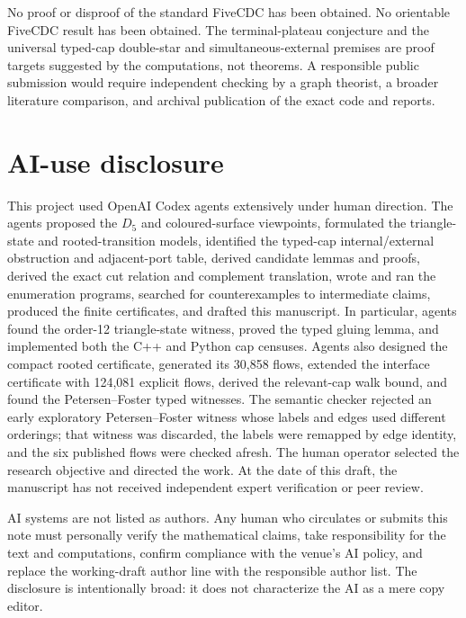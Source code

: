 \documentclass[11pt]{article}
\theoremstyle{definition}
\theoremstyle{remark}
\begin{document}
No proof or disproof of the standard FiveCDC has been obtained.  No
orientable FiveCDC result has been obtained.  The terminal-plateau
conjecture and the universal typed-cap double-star and simultaneous-external
premises are proof targets
suggested by the computations, not theorems.
A responsible public submission would require independent checking by a
graph theorist, a broader literature comparison, and archival publication
of the exact code and reports.

\section*{AI-use disclosure}

This project used OpenAI Codex agents extensively under human direction.
The agents proposed the \(D_5\) and coloured-surface viewpoints, formulated
the triangle-state and rooted-transition models, identified the typed-cap
internal/external obstruction and adjacent-port table, derived candidate
lemmas and proofs, derived the exact cut relation and complement translation,
wrote
and ran the enumeration programs, searched for counterexamples to
intermediate claims, produced the finite certificates, and drafted this
manuscript.  In particular, agents found the order-12 triangle-state
witness, proved the typed gluing lemma, and implemented both the C++ and
Python cap censuses.  Agents also designed the compact rooted certificate,
generated its 30,858 flows, extended the interface certificate with 124,081
explicit flows, derived the relevant-cap walk bound, and found
the Petersen--Foster typed witnesses.  The semantic checker rejected an
early exploratory Petersen--Foster witness whose labels and edges used
different orderings; that witness was discarded, the labels were remapped
by edge identity, and the six published flows were checked afresh.  The
human operator selected the research objective and directed the work.  At
the date of this draft, the manuscript has not
received independent expert verification or peer review.

AI systems are not listed as authors.  Any human who circulates or submits
this note must personally verify the mathematical claims, take
responsibility for the text and computations, confirm compliance with the
venue's AI policy, and replace the working-draft author line with the
responsible author list.  The disclosure is intentionally broad: it does
not characterize the AI as a mere copy editor.



\end{document}
